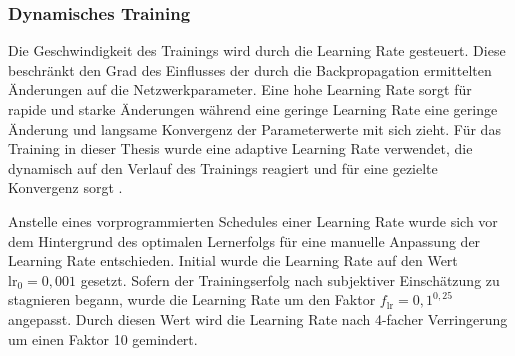 \subsubsection{Dynamisches Training}
\label{sec:dynamisches_training}

Die Geschwindigkeit des Trainings wird durch die Learning Rate gesteuert. Diese beschränkt den Grad des Einflusses der durch die Backpropagation ermittelten Änderungen auf die Netzwerkparameter. Eine hohe Learning Rate sorgt für rapide und starke Änderungen während eine geringe Learning Rate eine geringe Änderung und langsame Konvergenz der Parameterwerte mit sich zieht. Für das Training in dieser Thesis wurde eine adaptive Learning Rate verwendet, die dynamisch auf den Verlauf des Trainings reagiert und für eine gezielte Konvergenz sorgt \cite{adaptive_lr_schedule}.

Anstelle eines vorprogrammierten Schedules einer Learning Rate wurde sich vor dem Hintergrund des optimalen Lernerfolgs für eine manuelle Anpassung der Learning Rate entschieden. Initial wurde die Learning Rate auf den Wert $\text{lr}_0 = 0,001$ gesetzt. Sofern der Trainingserfolg nach subjektiver Einschätzung zu stagnieren begann, wurde die Learning Rate um den Faktor $f_\text{lr} = 0,1^{0,25}$ angepasst. Durch diesen Wert wird die Learning Rate nach 4-facher Verringerung um einen Faktor 10 gemindert.



